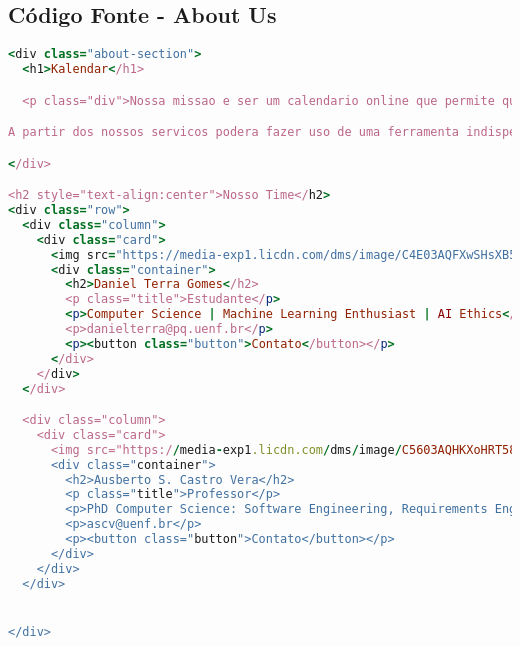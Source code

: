 \subsection{Código Fonte - About Us}

\begin{lstlisting}[language=Ruby, caption=About Us]
<div class="about-section">
  <h1>Kalendar</h1>

  <p class="div">Nossa missao e ser um calendario online que permite que um ou mais usuarios editem e, opcionalmente, compartilhem com outros usuarios o acesso online a um calendario.

A partir dos nossos servicos podera fazer uso de uma ferramenta indispensavel. Pois, nossas vidas diarias sao gerenciaveis apenas gracas aos nossos calendarios em nossos computadores e telefones. Um calendario online permite-nos gerir os nossos horarios e ajuda-nos na gestao do tempo. Pense em todas as vezes que as pessoas se esquecem de suas reunioes e compromissos agendados. As consequencias incluem remarcar as reunioes para uma data muito posterior ou ate mesmo pagar uma taxa por faltar a um compromisso. Um calendario online permite que voce sempre acompanhe suas reunioes e compromissos.</p>

</div>

<h2 style="text-align:center">Nosso Time</h2>
<div class="row">
  <div class="column">
    <div class="card">
      <img src="https://media-exp1.licdn.com/dms/image/C4E03AQFXwSHsXB5A-w/profile-displayphoto-shrink_200_200/0/1653855378664?e=1671062400&v=beta&t=JnZi5-8DhyHSwJWl68lXvud1KkoxXQDeGJyuVxGWdRY" alt="Daniel" style="width:5%">
      <div class="container">
        <h2>Daniel Terra Gomes</h2>
        <p class="title">Estudante</p>
        <p>Computer Science | Machine Learning Enthusiast | AI Ethics</p>
        <p>danielterra@pq.uenf.br</p>
        <p><button class="button">Contato</button></p>
      </div>
    </div>
  </div>

  <div class="column">
    <div class="card">
      <img src="https://media-exp1.licdn.com/dms/image/C5603AQHKXoHRT58ayQ/profile-displayphoto-shrink_200_200/0/1516814846280?e=1671062400&v=beta&t=cic_dbtWwgtjWRRnokSRsCxRugh6w52FOZYAksyRxEs" alt="Ausberto" style="width:5%">
      <div class="container">
        <h2>Ausberto S. Castro Vera</h2>
        <p class="title">Professor</p>
        <p>PhD Computer Science: Software Engineering, Requirements Engineering, Computer Security, Cloud Computing</p>
        <p>ascv@uenf.br</p>
        <p><button class="button">Contato</button></p>
      </div>
    </div>
  </div>


</div>


\end{lstlisting}
